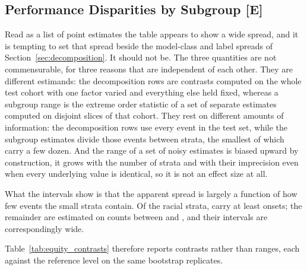 \subsection{Performance Disparities by Subgroup \texorpdfstring{[E]}{[E]}}

\begin{table}[H]
    \centering\footnotesize
    
    \caption{AUROC by racial stratum (Variant B, temporal test) with 95\%
    stay-level cluster-bootstrap intervals, stratified within stratum,
    $B = 2{,}000$. Levels are ordered by exposure; interval width grows by
    roughly an order of magnitude from the largest stratum to the smallest.
    Strata carrying fewer than \pcMinSubgroupEvents{} sepsis onsets are marked
    $\dagger$: they are shown so that the composition of the cohort is visible,
    and are neither interpreted nor entered into family E1
    (Section~\ref{sec:equity_strata}). \textbf{[E] exploratory.}}
    \label{tab:equity_performance}
\end{table}

Read as a list of point estimates the table appears to show a wide spread, and
it is tempting to set that spread beside the model-class and label spreads of
Section~\ref{sec:decomposition}. It should not be. The three quantities are not
commensurable, for three reasons that are independent of each other. They are
different estimands: the decomposition rows are contrasts computed on the whole
test cohort with one factor varied and everything else held fixed, whereas a
subgroup range is the extreme order statistic of a set of separate estimates
computed on disjoint slices of that cohort. They rest on different amounts of
information: the decomposition rows use every event in the test set, while the
subgroup estimates divide those events between strata, the smallest of which
carry a few dozen. And the range of a set of noisy estimates is biased upward
by construction, it grows with the number of strata and with their
imprecision even when every underlying value is identical, so it is not an
effect size at all.

What the intervals show is that the apparent spread is largely a function of
how few events the small strata contain. Of the racial strata,
\pcNSubgroupsAboveFloor{} carry at least \pcMinSubgroupEvents{} onsets; the
remainder are estimated on counts between \pcEquityRaceEightNEvents{} and
\pcEquityRaceFourNEvents, and their intervals are correspondingly wide.

Table~\ref{tab:equity_contrasts} therefore reports contrasts rather than
ranges, each against the reference level on the same bootstrap replicates.

